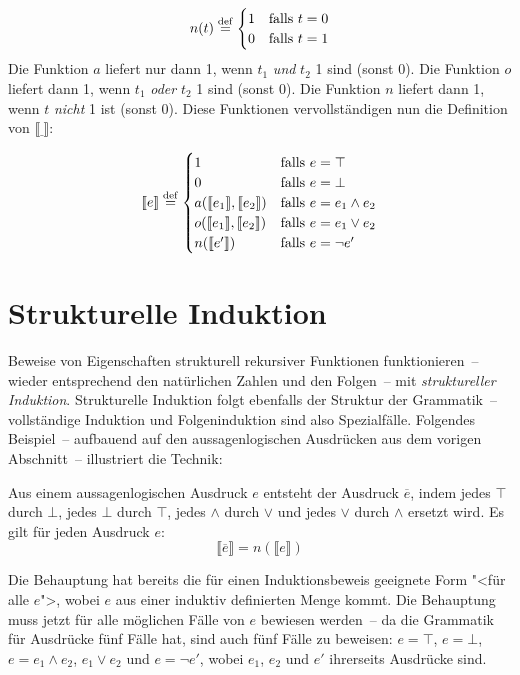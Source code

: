 \begin{displaymath}
  n(t) \stackrel{\rm def}{=} 
  \begin{cases}
    1 & \textrm{falls } t = 0\\
    0 & \textrm{falls } t = 1
  \end{cases}
\end{displaymath}
%
Die Funktion $a$ liefert nur dann 1, wenn $t_1$ \emph{und} $t_2$ 1
sind (sonst $0$).  Die Funktion $o$ liefert dann 1, wenn $t_1$
\emph{oder} $t_2$ 1 sind (sonst $0$).  Die Funktion $n$ liefert dann
1, wenn $t$ \emph{nicht} 1 ist (sonst $0$).  Diese Funktionen
vervollständigen nun die Definition von $\llbracket \underline{~}
\rrbracket$:

\begin{displaymath}
  \llbracket e \rrbracket \stackrel{\rm def}{=}
  \begin{cases}
    1 & \textrm{falls } e = \top\\
    0 & \textrm{falls } e = \bot\\
    a(\llbracket e_1 \rrbracket, \llbracket e_2 \rrbracket) & 
    \textrm{falls } e =
    e_1\wedge e_2\\
    o(\llbracket e_1 \rrbracket, \llbracket e_2 \rrbracket) & 
    \textrm{falls } e =
    e_1\vee e_2\\
    n(\llbracket e' \rrbracket) & \textrm{falls } e = \neg e'
  \end{cases}
\end{displaymath}

\section{Strukturelle Induktion}
\label{sec:structural-induction}

Beweise von Eigenschaften strukturell rekursiver Funktionen
funktionieren~-- wieder entsprechend den natürlichen Zahlen und den
Folgen~-- mit \textit{struktureller Induktion}. Strukturelle Induktion folgt
ebenfalls der Struktur der Grammatik~-- vollständige Induktion und
Folgeninduktion sind also Spezialfälle.  Folgendes Beispiel~-- aufbauend
auf den aussagenlogischen Ausdrücken aus dem vorigen Abschnitt~--
illustriert die Technik:

\begin{satz}
  Aus einem aussagenlogischen Ausdruck $e$ entsteht der Ausdruck
  $\overline{e}$\label{page:overline}, indem jedes $\top$ durch $\bot$, jedes $\bot$ durch
  $\top$, jedes $\wedge$ durch $\vee$ und jedes $\vee$ durch $\wedge$
  ersetzt wird.  Es gilt für jeden Ausdruck $e$:
  \begin{displaymath}
    \llbracket \overline{e}\rrbracket = n(\llbracket e\rrbracket)
  \end{displaymath}
\end{satz}
%
Die Behauptung hat bereits die für einen Induktionsbeweis geeignete
Form "<für alle $e$">, wobei $e$ aus einer induktiv definierten Menge
kommt.  Die Behauptung muss jetzt für alle möglichen Fälle von $e$
bewiesen werden~-- da die Grammatik für Ausdrücke fünf Fälle hat, sind
auch fünf Fälle zu beweisen: $e=\top$, $e=\bot$, $e=e_1\wedge e_2$,
$e_1\vee e_2$ und $e=\neg e'$, wobei $e_1$, $e_2$ und $e'$
ihrerseits Ausdrücke sind.

